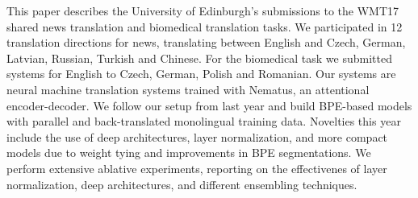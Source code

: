 This paper describes the University of Edinburgh's submissions to the WMT17 shared news translation and biomedical translation tasks. We participated in 12 translation directions for news, translating between English and Czech, German, Latvian, Russian, Turkish and Chinese. For the biomedical task we submitted systems for English to Czech, German, Polish and Romanian. Our systems are neural machine translation systems trained with Nematus, an attentional encoder-decoder. We follow our setup from last year and build BPE-based models with parallel and back-translated monolingual training data. Novelties this year include the use of deep architectures, layer normalization, and more compact models due to weight tying and  improvements in BPE segmentations. We perform extensive ablative experiments, reporting on the effectivenes of layer normalization, deep architectures, and different ensembling techniques.
